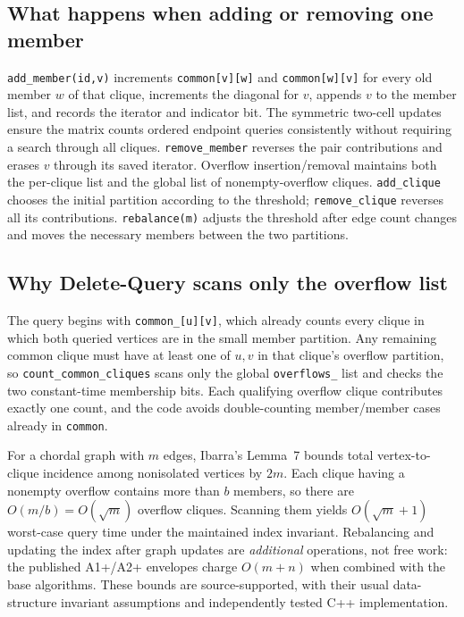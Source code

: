 \subsection{What happens when adding or removing one member}
\texttt{add\_member(id,v)} increments \texttt{common[v][w]} and \texttt{common[w][v]} for every old member \(w\) of that clique, increments the diagonal for \(v\), appends \(v\) to the member list, and records the iterator and indicator bit.  The symmetric two-cell updates ensure the matrix counts ordered endpoint queries consistently without requiring a search through all cliques.  \texttt{remove\_member} reverses the pair contributions and erases \(v\) through its saved iterator.  Overflow insertion/removal maintains both the per-clique list and the global list of nonempty-overflow cliques.  \texttt{add\_clique} chooses the initial partition according to the threshold; \texttt{remove\_clique} reverses all its contributions.  \texttt{rebalance(m)} adjusts the threshold after edge count changes and moves the necessary members between the two partitions.

\subsection{Why Delete-Query scans only the overflow list}
The query begins with \texttt{common\_[u][v]}, which already counts every clique in which both queried vertices are in the small member partition.  Any remaining common clique must have at least one of \(u,v\) in that clique's overflow partition, so \texttt{count\_common\_cliques} scans only the global \texttt{overflows\_} list and checks the two constant-time membership bits.  Each qualifying overflow clique contributes exactly one count, and the code avoids double-counting member/member cases already in \texttt{common}.

For a chordal graph with \(m\) edges, Ibarra's Lemma~7 bounds total vertex-to-clique incidence among nonisolated vertices by \(2m\).  Each clique having a nonempty overflow contains more than \(b\) members, so there are \(O(m/b)=O(\sqrt m)\) overflow cliques.  Scanning them yields \(O(\sqrt m+1)\) worst-case query time under the maintained index invariant.  Rebalancing and updating the index after graph updates are \emph{additional} operations, not free work: the published A1+/A2+ envelopes charge \(O(m+n)\) when combined with the base algorithms.  These bounds are source-supported, with their usual data-structure invariant assumptions and independently tested C++ implementation.

